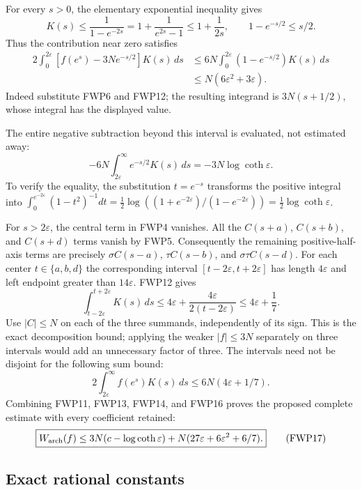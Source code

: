 \documentclass[11pt]{article}
\begin{document}
For every $s>0$, the elementary exponential inequality gives
\[
 K(s)\le\frac1{1-e^{-2s}}
       =1+\frac1{e^{2s}-1}\le1+\frac1{2s},
 \qquad 1-e^{-s/2}\le s/2.
 \tag{FWP12}
\]
Thus the contribution near zero satisfies
\[
\begin{split}
 2\int_0^{2\varepsilon}[f(e^s)-3Ne^{-s/2}]K(s)\,ds
 &\le6N\int_0^{2\varepsilon}(1-e^{-s/2})K(s)\,ds\\
 &\le N(6\varepsilon^2+3\varepsilon).
\end{split}
\tag{FWP13}
\]
Indeed substitute FWP6 and FWP12; the resulting integrand is
$3N(s+1/2)$, whose integral has the displayed value.

The entire negative subtraction beyond this interval is evaluated,
not estimated away:
\[
 -6N\int_{2\varepsilon}^\infty e^{-s/2}K(s)\,ds
 =-3N\log\coth\varepsilon.
 \tag{FWP14}
\]
To verify the equality, the substitution $t=e^{-s}$ transforms the
positive integral into
$\int_0^{e^{-2\varepsilon}}(1-t^2)^{-1}dt
=\tfrac12\log((1+e^{-2\varepsilon})/(1-e^{-2\varepsilon}))
=\tfrac12\log\coth\varepsilon$.

For $s>2\varepsilon$, the central term in FWP4 vanishes. All
the $C(s+a)$, $C(s+b)$, and $C(s+d)$ terms vanish by FWP5.
Consequently the remaining positive-half-axis terms are precisely
$\sigma C(s-a)$, $\tau C(s-b)$, and $\sigma\tau C(s-d)$.
For each center $t\in\{a,b,d\}$ the corresponding interval
$[t-2\varepsilon,t+2\varepsilon]$ has length $4\varepsilon$
and left endpoint greater than $14\varepsilon$. FWP12 gives
\[
 \int_{t-2\varepsilon}^{t+2\varepsilon}K(s)\,ds
 \le4\varepsilon+\frac{4\varepsilon}{2(t-2\varepsilon)}
 \le4\varepsilon+\frac17.
 \tag{FWP15}
\]
Use $|C|\le N$ on each of the three summands, independently of
its sign. This is the exact decomposition bound; applying the
weaker $|f|\le3N$ separately on three intervals would add an
unnecessary factor of three. The intervals need not be disjoint
for the following sum bound:
\[
 2\int_{2\varepsilon}^\infty f(e^s)K(s)\,ds
 \le6N(4\varepsilon+1/7).
 \tag{FWP16}
\]
Combining FWP11, FWP13, FWP14, and FWP16 proves the proposed
complete estimate with every coefficient retained:
\[
 \boxed{W_{\rm arch}(f)
 \le3N(c-\log\coth\varepsilon)
       +N(27\varepsilon+6\varepsilon^2+6/7).}
 \tag{FWP17}
\]

\subsection{Exact rational constants}
\end{document}
